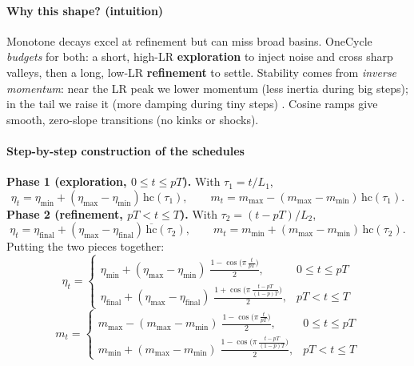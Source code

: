 \begin{enrichment}
	\paragraph{Why this shape? (intuition)}
	Monotone decays excel at refinement but can miss broad basins. OneCycle \emph{budgets} for both: a short, high-LR \textbf{exploration} to inject noise and cross sharp valleys, then a long, low-LR \textbf{refinement} to settle. Stability comes from \emph{inverse momentum}: near the LR peak we lower momentum (less inertia during big steps); in the tail we raise it (more damping during tiny steps) \cite{smith2017_clr, smith2018_superconvergence}. Cosine ramps give smooth, zero-slope transitions (no kinks or shocks).
	
	\paragraph{Step-by-step construction of the schedules}
	\textbf{Phase 1 (exploration, $0\le t\le pT$).} With $\tau_1=t/L_1$,
	\[
	\eta_t=\eta_{\text{min}}+(\eta_{\text{max}}-\eta_{\text{min}})\,\mathrm{hc}(\tau_1),
	\qquad
	m_t=m_{\text{max}}-(m_{\text{max}}-m_{\text{min}})\,\mathrm{hc}(\tau_1).
	\]
	\textbf{Phase 2 (refinement, $pT< t\le T$).} With $\tau_2=(t-pT)/L_2$,
	\[
	\eta_t=\eta_{\text{final}}+(\eta_{\text{max}}-\eta_{\text{final}})\,\overline{\mathrm{hc}}(\tau_2),
	\qquad
	m_t=m_{\text{min}}+(m_{\text{max}}-m_{\text{min}})\,\mathrm{hc}(\tau_2).
	\]
	Putting the two pieces together:
	\begin{equation}
		\eta_t=
		\begin{cases}
			\displaystyle \eta_{\text{min}}+(\eta_{\text{max}}-\eta_{\text{min}})\;\frac{1-\cos\!\big(\pi\,\tfrac{t}{pT}\big)}{2}, & 0\le t\le pT\\[8pt]
			\displaystyle \eta_{\text{final}}+(\eta_{\text{max}}-\eta_{\text{final}})\;\frac{1+\cos\!\big(\pi\,\tfrac{t-pT}{(1-p)T}\big)}{2}, & pT< t\le T
		\end{cases}
		\label{eq:chapter10_onecycle_lr}
	\end{equation}
	\begin{equation}
		m_t=
		\begin{cases}
			\displaystyle m_{\text{max}}-(m_{\text{max}}-m_{\text{min}})\;\frac{1-\cos\!\big(\pi\,\tfrac{t}{pT}\big)}{2}, & 0\le t\le pT\\[8pt]
			\displaystyle m_{\text{min}}+(m_{\text{max}}-m_{\text{min}})\;\frac{1-\cos\!\big(\pi\,\tfrac{t-pT}{(1-p)T}\big)}{2}, & pT< t\le T
		\end{cases}
		\label{eq:chapter10_onecycle_mom}
	\end{equation}
	

\end{enrichment}
